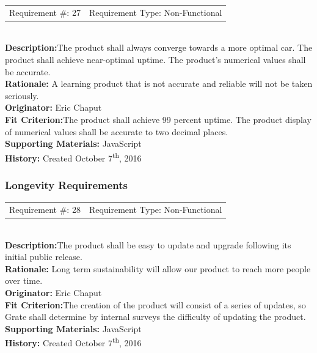 \documentclass[12pt, titlepage]{article}
\begin{document}
\begin{reqbox}
%
\begin{tabular}{cc}
Requirement \#: 27 & Requirement Type: Non-Functional \\
\end{tabular} \\
%
\textbf{Description:}The product shall always converge towards a more optimal car. The product shall achieve near-optimal uptime. The product's numerical values shall be accurate.  \\
\textbf{Rationale:}  A learning product that is not accurate and reliable will not be taken seriously.\\
\textbf{Originator:} Eric Chaput\\
\textbf{Fit Criterion:}The product shall achieve 99 percent uptime. The product display of numerical values shall be accurate to two decimal places.\\
%  
\textbf{Supporting Materials:} JavaScript \\
\textbf{History:} Created October 7\textsuperscript{th}, 2016
%
\end{reqbox}

\newpage

\subsubsection{Longevity Requirements}

\begin{reqbox}
%
\begin{tabular}{cc}
Requirement \#: 28 & Requirement Type: Non-Functional \\
\end{tabular} \\
%
\textbf{Description:}The product shall be easy to update and upgrade following its initial public 
release.\\
\textbf{Rationale:}  Long term sustainability will allow our product to reach more people over time.\\
\textbf{Originator:} Eric Chaput\\
\textbf{Fit Criterion:}The creation of the product will consist of a series of updates, so Grate shall determine by internal surveys the difficulty of updating the product.\\
%  
\textbf{Supporting Materials:} JavaScript \\
\textbf{History:} Created October 7\textsuperscript{th}, 2016
%
\end{reqbox}
\end{document}

